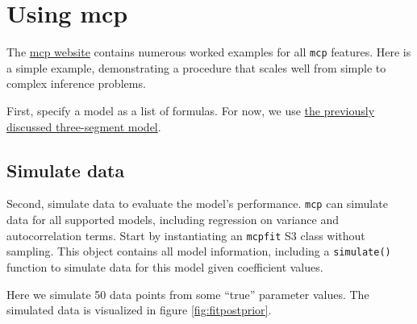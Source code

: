 \documentclass[
  american,
]{article}
\newenvironment{Shaded}{\begin{snugshade}}{\end{snugshade}}
\newcommand{\CommentTok}[1]{\textcolor[rgb]{0.56,0.35,0.01}{\textit{#1}}}
\newcommand{\DataTypeTok}[1]{\textcolor[rgb]{0.13,0.29,0.53}{#1}}
\newcommand{\DecValTok}[1]{\textcolor[rgb]{0.00,0.00,0.81}{#1}}
\newcommand{\FloatTok}[1]{\textcolor[rgb]{0.00,0.00,0.81}{#1}}
\newcommand{\KeywordTok}[1]{\textcolor[rgb]{0.13,0.29,0.53}{\textbf{#1}}}
\newcommand{\NormalTok}[1]{#1}
\newcommand{\OperatorTok}[1]{\textcolor[rgb]{0.81,0.36,0.00}{\textbf{#1}}}
\newcommand{\OtherTok}[1]{\textcolor[rgb]{0.56,0.35,0.01}{#1}}
\newcommand{\StringTok}[1]{\textcolor[rgb]{0.31,0.60,0.02}{#1}}
\begin{document}
\hypertarget{using-mcp}{%
\section{Using mcp}\label{using-mcp}}

The \href{http://lindeloev.github.io/mcp/}{mcp website} contains numerous worked examples for all \texttt{mcp} features. Here is a simple example, demonstrating a procedure that scales well from simple to complex inference problems.

First, specify a model as a list of formulas. For now, we use \protect\hyperlink{segments_api}{the previously discussed three-segment model}.

\hypertarget{simulate}{%
\subsection{Simulate data}\label{simulate}}

Second, simulate data to evaluate the model's performance. \texttt{mcp} can simulate data for all supported models, including regression on variance and autocorrelation terms. Start by instantiating an \texttt{mcpfit} S3 class without sampling. This object contains all model information, including a \texttt{simulate()} function to simulate data for this model given coefficient values.

Here we simulate 50 data points from some ``true'' parameter values. The simulated data is visualized in figure \ref{fig:fitpostprior}.

\begin{Shaded}
\end{Shaded}
\end{document}
